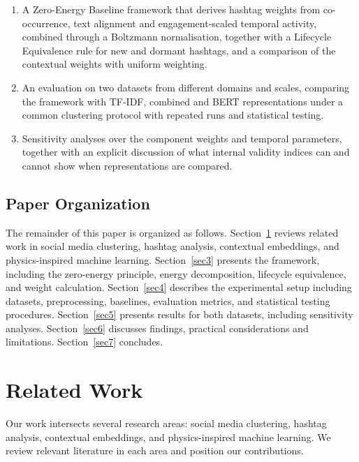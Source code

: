 \documentclass[pdflatex,sn-mathphys-num]{sn-jnl}%
\begin{document}
\begin{enumerate}
\item A Zero-Energy Baseline framework that derives hashtag weights from co-occurrence, text alignment and engagement-scaled temporal activity, combined through a Boltzmann normalisation, together with a Lifecycle Equivalence rule for new and dormant hashtags, and a comparison of the contextual weights with uniform weighting.
\item An evaluation on two datasets from different domains and scales, comparing the framework with TF-IDF, combined and BERT representations under a common clustering protocol with repeated runs and statistical testing.
\item Sensitivity analyses over the component weights and temporal parameters, together with an explicit discussion of what internal validity indices can and cannot show when representations are compared.
\end{enumerate}

\subsection{Paper Organization}\label{subsec2}

The remainder of this paper is organized as follows. Section~\ref{sec2} reviews related work in social media clustering, hashtag analysis, contextual embeddings, and physics-inspired machine learning. Section~\ref{sec3} presents the framework, including the zero-energy principle, energy decomposition, lifecycle equivalence, and weight calculation. Section~\ref{sec4} describes the experimental setup including datasets, preprocessing, baselines, evaluation metrics, and statistical testing procedures. Section~\ref{sec5} presents results for both datasets, including sensitivity analyses. Section~\ref{sec6} discusses findings, practical considerations and limitations. Section~\ref{sec7} concludes.


\section{Related Work}\label{sec2}

Our work intersects several research areas: social media clustering, hashtag analysis, contextual embeddings, and physics-inspired machine learning. We review relevant literature in each area and position our contributions.
\end{document}
